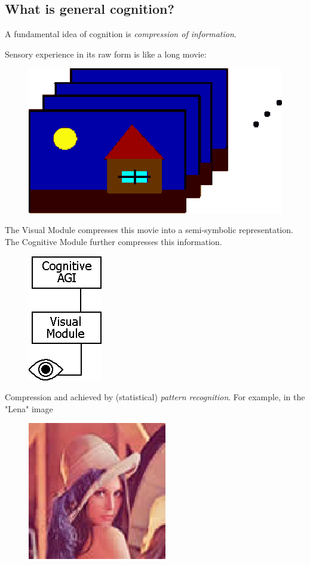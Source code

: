 \subsection{What is  general cognition?}

A fundamental idea of cognition is \emph{compression of information}.

Sensory experience in its raw form is like a long movie:

\begin{figure}[H]
\centering
\includegraphics[scale=0.6, bb=0 0 272 155]{Movie.eps}
\end{figure}

The Visual Module compresses this movie into a semi-symbolic representation. The Cognitive Module further compresses this information. 

\begin{figure}[H]
\centering
\includegraphics[scale=0.7, bb=0 0 122 207]{GI-Vision.PNG}
\end{figure}

Compression and achieved by (statistical) \emph{pattern recognition}. For example, in the "Lena" image

\begin{figure}[H]
\centering
\includegraphics[scale=0.7,bb=0 0 103 103]{Lena-Tiny.eps}
\end{figure}

